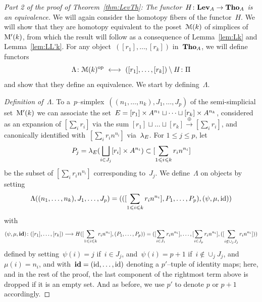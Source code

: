 \begin{proof}[Part 2 of the proof of Theorem~\ref{thm:LevTh}: The functor~$H\colon\mathbf{Lev}_A\to \mathbf{Tho}_A$ is an equivalence]
We will again consider the homotopy fibers of the functor~$H$. We will show that they are homotopy equivalent to  
the poset~$\mathcal{M}(k)$ of simplices of~$\mathrm{M}'(k)$, 
from which the result will follow as a consequence of Lemma~\ref{lem:Lk} and Lemma~\ref{lem:LL'k}. 
For any object~$([r_1],\dots,[r_k])$ in~$\mathbf{Tho}_A$, we will define functors
$$\Lambda\colon\calM(k)^{\op} \ \longleftrightarrow \ ([r_1],\dots,[r_k])\minus H\colon\Pi$$
and show that they define an equivalence. 
We start by defining~$\Lambda$. 

\noindent
{\em Definition of~$\Lambda$.} To a~$p$--simplex~$((n_1,\dots,n_k),J_1,\dots,J_p)$ of the semi-simplicial set~$\mathrm{M}'(k)$ we 
can associate the set~\hbox{$E=[r_1]\times A^{n_1}\sqcup \dots\sqcup [r_k]\times A^{n_k}$}, considered as an expansion of $[\sum_ir_i]$ via the sum $[r_1]\sqcup\dots\sqcup [r_k]\xrightarrow{\oplus} [\sum_ir_i]$, and  canonically identified with~$[\sum_i r_in^{n_i}]$ via~$\lambda_E$. 
For $1\le j\le p$, let 
\[
P_j=\lambda_E(\bigsqcup_{i\in J_j}[r_i]\times A^{n_i})\subset [\sum_{1\leqslant i\leqslant k} r_in^{n_i}]
\]
be the subset of $ [\sum_ir_in^{n_i}]$ corresponding to~$J_j$. 
We define~$\Lambda$ on objects by setting
$$\Lambda((n_1,\dots,n_k),J_1,\dots,J_p)= (([\sum_{1\leqslant i\leqslant k} r_in^{n_i}],P_1,\dots,P_p),(\psi,\mu,\operatorname{id}))$$
with
\[
(\psi,\mu,{\bf id})\colon([r_1],\dots,[r_k])\longrightarrow H([\sum_{1\leqslant i\leqslant k} r_in^{n_i}],(P_1,\dots,P_p))=([\sum_{i\in J_1}r_in^{n_i}],\dots,[\sum_{i\in J_p}r_in^{n_i}],([\sum_{i\notin\cup_j J_j}r_in^{n_i}]))
\]
defined by  
setting~$\psi(i)=j$ if~$i\in J_j$, and~$\psi(i)=p+1$ if~$i\notin\cup_jJ_j$, and~$\mu(i)=n_i$, and with~${\bf id}=(\operatorname{id},\dots,\operatorname{id})$ denoting a $p'$--tuple of identity maps; 
here, and in the rest of the proof, the last component of the rightmost term above is dropped if it is an empty set. And as before, we use $p'$ to denote $p$ or $p+1$ accordingly. 



\end{proof}
